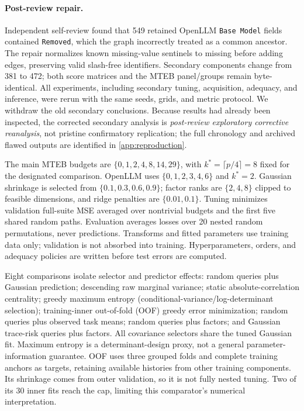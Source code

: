 \documentclass{article}
\begin{document}
\paragraph{Post-review repair.} Independent self-review found that 549 retained OpenLLM \texttt{Base Model} fields contained \texttt{Removed}, which the graph incorrectly treated as a common ancestor. The repair normalizes known missing-value sentinels to missing before adding edges, preserving valid slash-free identifiers. Secondary components change from 381 to 472; both score matrices and the MTEB panel/groups remain byte-identical. All experiments, including secondary tuning, acquisition, adequacy, and inference, were rerun with the same seeds, grids, and metric protocol. We withdraw the old secondary conclusions. Because results had already been inspected, the corrected secondary analysis is \emph{post-review exploratory corrective reanalysis}, not pristine confirmatory replication; the full chronology and archived flawed outputs are identified in \cref{app:reproduction}.

The main MTEB budgets are $\{0,1,2,4,8,14,29\}$, with $k^*=\lceil p/4\rceil=8$ fixed for the designated comparison. OpenLLM uses $\{0,1,2,3,4,6\}$ and $k^*=2$. Gaussian shrinkage is selected from $\{0.1,0.3,0.6,0.9\}$; factor ranks are $\{2,4,8\}$ clipped to feasible dimensions, and ridge penalties are $\{0.01,0.1\}$. Tuning minimizes validation full-suite MSE averaged over nontrivial budgets and the first five shared random paths. Evaluation averages losses over 20 nested random permutations, never predictions. Transforms and fitted parameters use training data only; validation is not absorbed into training. Hyperparameters, orders, and adequacy policies are written before test errors are computed.

Eight comparisons isolate selector and predictor effects: random queries plus Gaussian prediction; descending raw marginal variance; static absolute-correlation centrality; greedy maximum entropy (conditional-variance/log-determinant selection); training-inner out-of-fold (OOF) greedy error minimization; random queries plus observed task means; random queries plus factors; and Gaussian trace-risk queries plus factors. All covariance selectors share the tuned Gaussian fit. Maximum entropy is a determinant-design proxy, not a general parameter-information guarantee. OOF uses three grouped folds and complete training anchors as targets, retaining available histories from other training components. Its shrinkage comes from outer validation, so it is not fully nested tuning. Two of its 30 inner fits reach the cap, limiting this comparator's numerical interpretation.
\end{document}
